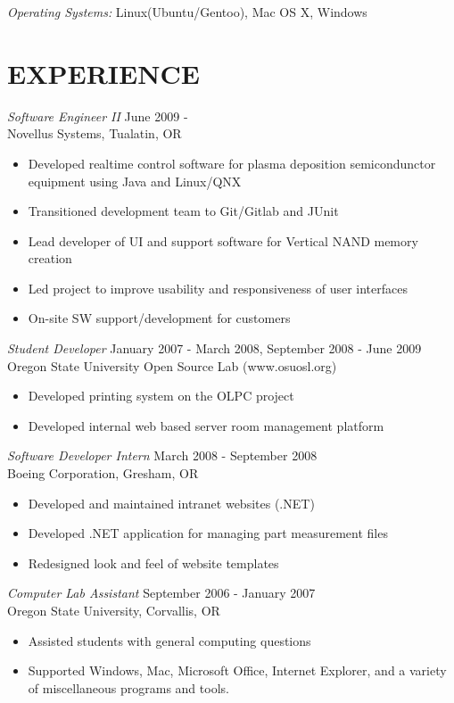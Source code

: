 \documentclass[margin]{res}
\begin{document}
\begin{resume}
		{\sl Operating Systems:} Linux(Ubuntu/Gentoo), Mac OS X, Windows
 
\section{EXPERIENCE} {\sl Software Engineer II} \hfill June 2009 -  \\
                Novellus Systems,  Tualatin, OR 
                 \begin{itemize}  \itemsep -2pt %
                 \item Developed realtime control software for 
				 plasma deposition semicondunctor equipment using Java and Linux/QNX
                \item Transitioned development team to Git/Gitlab and JUnit 
                \item Lead developer of UI and support software for Vertical NAND memory creation 
				\item Led project to improve usability and responsiveness of user interfaces
				\item On-site SW support/development for customers
                \end{itemize}
 
                {\sl Student Developer} \hfill            January 2007 - March 2008, September 2008 - June 2009 \\
                Oregon State University Open Source Lab (www.osuosl.org)
                 \begin{itemize}  \itemsep -2pt %
                 \item Developed printing system on the OLPC project
				 \item Developed internal web based server room management platform
                 \end{itemize}

                {\sl Software Developer Intern} \hfill         March 2008 - September 2008\\
                Boeing Corporation, Gresham, OR
                  \begin{itemize}
                   \item Developed and maintained intranet websites (.NET)
				   \item Developed .NET application for managing part measurement files
				   \item Redesigned look and feel of website templates
                   \end{itemize} 
 
 				{\sl Computer Lab Assistant} \hfill         September 2006 - January 2007\\
                Oregon State University, Corvallis, OR
                  \begin{itemize}
                   \item Assisted students with general computing questions
				   \item Supported Windows, Mac, Microsoft Office, Internet Explorer, and a variety
				   of miscellaneous programs and tools.
                   \end{itemize} 
\end{resume}
\end{document}
